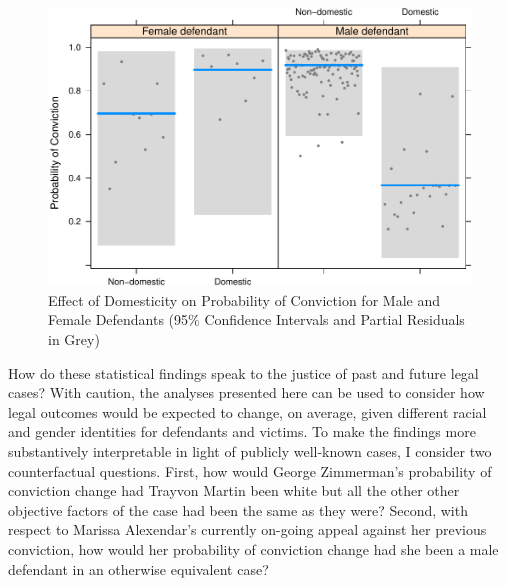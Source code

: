 \documentclass[12pt,article]{article}
\begin{document}
\begin{figure}[htbp]
\centering
\includegraphics{stand_your_ground_article_files/figure-latex/unnamed-chunk-5.pdf}
\caption{Effect of Domesticity on Probability of Conviction for Male and
Female Defendants (95\% Confidence Intervals and Partial Residuals in
Grey)}
\end{figure}

How do these statistical findings speak to the justice of past and
future legal cases? With caution, the analyses presented here can be
used to consider how legal outcomes would be expected to change, on
average, given different racial and gender identities for defendants and
victims. To make the findings more substantively interpretable in light
of publicly well-known cases, I consider two counterfactual questions.
First, how would George Zimmerman's probability of conviction change had
Trayvon Martin been white but all the other other objective factors of
the case had been the same as they were? Second, with respect to Marissa
Alexendar's currently on-going appeal against her previous conviction,
how would her probability of conviction change had she been a male
defendant in an otherwise equivalent case?
\end{document}
